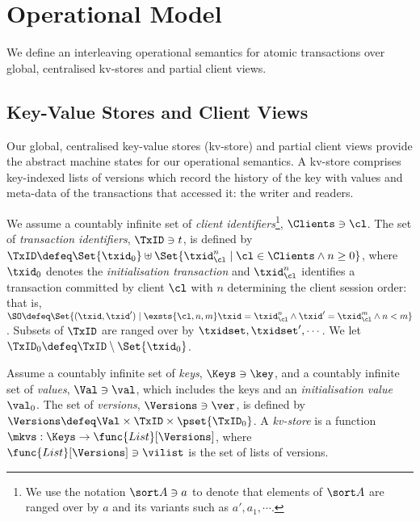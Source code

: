 \section{Operational Model}
\label{sec:model}

We define an interleaving operational semantics for atomic transactions over
global, centralised kv-stores and partial client views. 

\subsection{Key-Value Stores and Client Views}
\label{subsec:kvstores}
\label{sec:mkvs-view}
Our global, centralised key-value stores (kv-store) and partial client views
provide the abstract machine states for our operational semantics. A
kv-store comprises key-indexed lists of versions which record
the history of the key with values and meta-data of the
transactions that accessed it: the writer and readers.

We assume a countably infinite set of \emph{client identifiers}\footnote{ We use the notation
 $\sort A \ni a$ to denote that elements of $\sort A$ are ranged over
  by $a$ and its variants such as $a', a_1, \cdots$.},
$\Clients \ni \cl$.
The set of \emph{transaction identifiers}, $\TxID \ni t$, 
 is defined by
$\TxID \defeq  \Set{\txid_{0}} \uplus \Set{ \txid_{\cl}^{n} \mid \cl
  \in \Clients \land n \geq 0 }$, 
where  $\txid_0$ denotes  the  \emph{initialisation transaction}
and $\txid_{\cl}^{n}$ identifies a transaction committed by client
$\cl$ with $n$  determining  the client session order: that is, $\SO \defeq \Set{ (\txid, \txid') \mid \exsts{ \cl, n,m } \txid =
\txid_{\cl}^{n} \land \txid' = \txid_{\cl}^{m} \land n < m}$.
Subsets of $\TxID$  are ranged over by $\txidset, \txidset', \cdots$. 
We let $\TxID_{0} \defeq \TxID \setminus \Set{\txid_0}$. 

\spaceshrink{-3pt}
\begin{definition}[Kv-stores]
\label{def:his_heap}
\label{def:mkvs}
Assume a countably infinite set of \emph{keys}, $\Keys \ni \key$, 
and a countably infinite set of  \emph{values}, $\Val \ni \val$, 
which includes the keys and an \emph{initialisation value} $\val_0$.
The set of \emph{versions}, $\Versions \ni \ver$, is defined by $\Versions \defeq \Val \times \TxID \times \pset{\TxID_{0}}$. 
A \emph{kv-store} 
is a function $\mkvs: \Keys \to \func{List}[\Versions]$, 
where $\func{List}[\Versions] \ni \vilist$ is the set of lists of versions. %
\end{definition}
\spaceshrink{-3pt}

